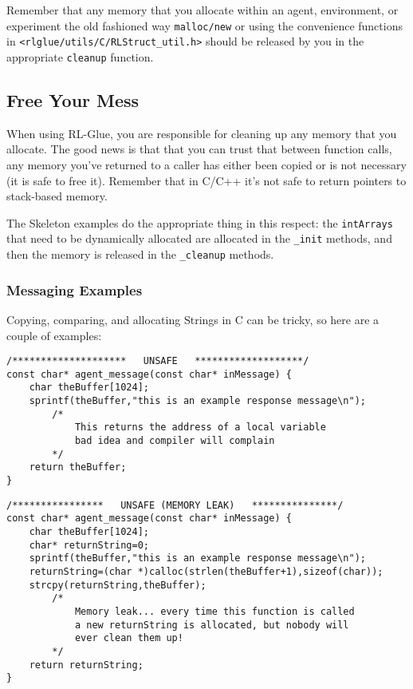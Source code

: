 \documentclass[11pt]{article}
\begin{document}
Remember that any memory that you allocate within an agent, environment, or experiment the old fashioned way \texttt{malloc/new} or using the convenience functions in \texttt{<rlglue/utils/C/RLStruct\_util.h>} should be released
by you in the appropriate \texttt{cleanup} function.
\subsection{Free Your Mess}
When using RL-Glue, you are responsible for cleaning up any memory that you allocate. The good news is that that you can trust that between function calls, any memory you've returned to a caller has either been
copied or is not necessary (it is safe to free it).  Remember that in C/C++ it's not safe to return pointers to stack-based memory.

The Skeleton examples do the appropriate thing in this respect: the \texttt{intArrays} that need to be dynamically allocated are allocated in the \texttt{\_init} methods, and then the memory is released in the \texttt{\_cleanup} methods.

\subsubsection{Messaging Examples}
Copying, comparing, and allocating Strings in C can be tricky, so here are a couple of examples:

\begin{verbatim}
/********************   UNSAFE   *******************/
const char* agent_message(const char* inMessage) {
    char theBuffer[1024];
    sprintf(theBuffer,"this is an example response message\n");
        /*
            This returns the address of a local variable
            bad idea and compiler will complain
        */
    return theBuffer;
}
\end{verbatim}

\begin{verbatim}
/****************   UNSAFE (MEMORY LEAK)   ***************/
const char* agent_message(const char* inMessage) {
    char theBuffer[1024];
    char* returnString=0;
    sprintf(theBuffer,"this is an example response message\n");
    returnString=(char *)calloc(strlen(theBuffer+1),sizeof(char));
    strcpy(returnString,theBuffer);
        /*
            Memory leak... every time this function is called
            a new returnString is allocated, but nobody will
            ever clean them up!
        */
    return returnString;
}
\end{verbatim}
\end{document}
